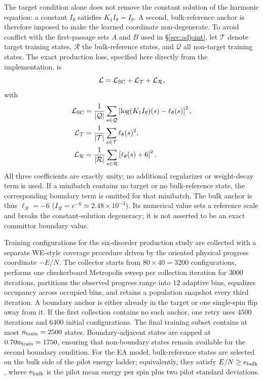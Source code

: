 \documentclass[a4paper,fleqn]{cas-sc}
\begin{document}
The target condition alone does not remove the constant solution of the harmonic equation: a
constant $I_\theta$ satisfies $K_1 I_\theta=I_\theta$.  A second, bulk-reference anchor is
therefore imposed to make the learned coordinate non-degenerate.  To avoid conflict with the
first-passage sets $A$ and $B$ used in \S\ref{sec:adjoint}, let $\mathcal T$ denote target
training states, $\mathcal R$ the bulk-reference states, and $\mathcal Q$ all non-target
training states.  The exact production loss, specified here directly from the implementation,
is
\begin{equation}
\mathcal L=\mathcal L_{\rm SC}+\mathcal L_{\mathcal T}+\mathcal L_{\mathcal R},
\label{eq:nloss}
\end{equation}
with
\begin{align}
\mathcal L_{\rm SC}
 &=\frac{1}{|\mathcal Q|}\sum_{s\in\mathcal Q}
 \left[\log(K_1I_\theta)(s)-\ell_\theta(s)\right]^2,\nonumber\\
\mathcal L_{\mathcal T}
 &=\frac{1}{|\mathcal T|}\sum_{s\in\mathcal T}\ell_\theta(s)^2,\nonumber\\
\mathcal L_{\mathcal R}
 &=\frac{1}{|\mathcal R|}\sum_{s\in\mathcal R}
 \left[\ell_\theta(s)+6\right]^2.
\label{eq:nlossparts}
\end{align}
All three coefficients are exactly unity; no additional regularizer or weight-decay term is
used.  If a minibatch contains no target or no bulk-reference state, the corresponding boundary
term is omitted for that minibatch.  The bulk anchor is thus
$\ell_{\mathcal R}=-6$ ($I_{\mathcal R}=e^{-6}\simeq2.48\times10^{-3}$).  Its numerical value
sets a reference scale and breaks the constant-solution degeneracy; it is not asserted to be an
exact committor boundary value.

Training configurations for the six-disorder production study are collected with a separate
WE-style coverage procedure driven by the oriented physical progress coordinate $-E/N$.
The collector starts from $80\times40=3200$ configurations, performs one checkerboard
Metropolis sweep per collection iteration for $3000$ iterations, partitions the observed
progress range into $12$ adaptive bins, equalizes occupancy across occupied bins, and retains a
population snapshot every third iteration.  A boundary anchor is either already in the target
or one single-spin flip away from it.  If the first collection contains no such anchor, one
retry uses $4500$ iterations and $6400$ initial configurations.  The final training subset
contains at most $n_{\rm train}=2500$ states.  Boundary-adjacent states are capped at
$0.70n_{\rm train}=1750$, ensuring that non-boundary states remain available for the second
boundary condition.  For the EA model, bulk-reference states are selected on the bulk side of
the pilot energy ladder; equivalently, they satisfy $E/N\ge e_{\rm bulk}$, where
$e_{\rm bulk}$ is the pilot mean energy per spin plus two pilot standard deviations.
\end{document}
